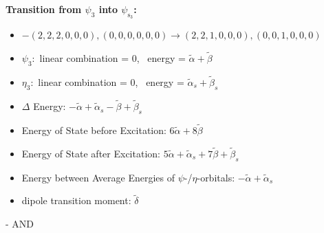 \documentclass[12pt,a4paper]{article}
\begin{document}
        \noindent\textbf{Transition from $\psi_{3}$ into $\psi_{\text{s}_{3}}$:}
        \begin{itemize}
            \item $- (2, 2, 2, 0, 0, 0), (0, 0, 0, 0, 0, 0) \rightarrow (2, 2, 1, 0, 0, 0), (0, 0, 1, 0, 0, 0)$
        
            \item $\psi_{3}:$ linear combination = $0$, \
            energy = $\tilde{\alpha} + \tilde{\beta}$
            
            \item $\eta_{3}:$ linear combination = $0$, \
            energy = $\tilde{\alpha}_{s} + \tilde{\beta}_{s}$
            
                \item $\Delta$ Energy: $- \tilde{\alpha} + \tilde{\alpha}_{s} - \tilde{\beta} + \tilde{\beta}_{s}$
                \item Energy of State before Excitation: $6 \tilde{\alpha} + 8 \tilde{\beta}$
                \item Energy of State after Excitation: $5 \tilde{\alpha} + \tilde{\alpha}_{s} + 7 \tilde{\beta} + \tilde{\beta}_{s}$
                \item Energy between Average Energies of $\psi$-/$\eta$-orbitals: $- \tilde{\alpha} + \tilde{\alpha}_{s}$
            
            \item dipole transition moment: $\tilde{\delta}$
        
        \end{itemize}
        
 -  AND 
\end{document}
